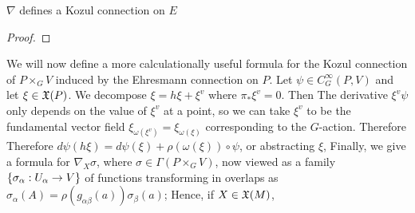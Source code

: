 \documentclass{article}
\begin{document}
\begin{prop}
$\nabla$ defines a Kozul connection on $E$ 
\end{prop}
\begin{proof}
\end{proof}

We will now define a more calculationally useful formula for the Kozul connection of $P \times_G V$ induced by the Ehresmann connection on $P$. Let $\psi \in C^\infty_G(P,V)$ and let $\xi \in \mathfrak{X}(P)$. We decompose $\xi = h\xi + \xi^v$ where $\pi_\ast \xi^v = 0$. Then 
The derivative $\xi^v \psi$ only depends on the value of $\xi^v$ at a point, so we can take $\xi^v$ to be the fundamental vector field $\xi_{\omega(\xi^v)} = \xi_{\omega(\xi)}$ corresponding to the $G$-action. Therefore 
Therefore $d\psi(h\xi) = d\psi(\xi) + \rho(\omega(\xi)) \circ \psi$, or abstracting $\xi$, 
Finally, we give a formula for $\nabla_X \sigma$, where $\sigma \in \Gamma(P \times_G V)$, now viewed as a family $\left\{ \sigma_\alpha : U_\alpha \to V \right\}$ of functions transforming in overlaps as $\sigma_\alpha(A) = \rho(g_{\alpha\beta}(a)) \sigma_\beta(a)$;
Hence, if $X \in \mathfrak{X}(M)$, 
\end{document}

